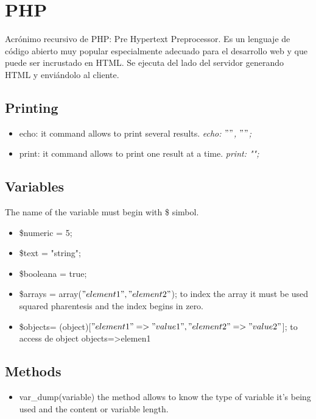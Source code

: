 \section{PHP}

Acrónimo recursivo de PHP: Pre Hypertext Preprocessor.  Es un lenguaje de código abierto muy popular especialmente adecuado para el desarrollo web y que puede ser incrustado en HTML. Se ejecuta del lado del servidor generando HTML y enviándolo al cliente.

\subsection{Printing}

\begin{itemize}
	\item echo: it command allows to print several results. \textit{echo: $""$, $""$;}
	\item print: it command  allows to print one result at a time. \textit{print: "";}
\end{itemize}


\subsection{Variables}

The name of the variable must begin with \$ simbol.
\begin{itemize}
	\item \$numeric = 5;
	\item \$text = "string";
	\item \$booleana = true;
	\item \$arrays = array($"element1","element2"$); to index the array it must be used squared pharentesis and the index begins in zero.
	\item \$objects= (object)[$"element1"=>"value1","element2"=>"value2"$]; to access de object objects=>elemen1
\end{itemize}

\subsection{Methods}

\begin{itemize}
	\item var\_dump(variable) the method allows to know the type of variable it's being used and the content or variable length.
\end{itemize}

